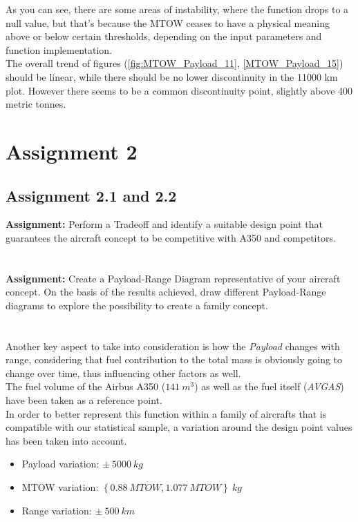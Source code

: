 \documentclass{article}
\begin{document}
As you can see, there are some areas of instability, where the function drops to a null value,
but that's because the MTOW ceases to have a physical meaning above or below certain
thresholds, depending on the input parameters and function implementation. \\ 
The overall trend of figures (\ref{fig:MTOW_Payload_11}, \ref{MTOW_Payload_15}) should be linear, while
there should be no lower discontinuity in the 11000 km plot.
However there seems to be a common discontinuity point, slightly above 400 metric tonnes.
\clearpage

\section{Assignment 2\label{Assignment_2}}
\subsection{Assignment 2.1 and 2.2\label{Assignment_2.1}}
\textbf{Assignment:} Perform a Tradeoff and identify a suitable design point that 
guarantees the aircraft concept to be competitive with A350 and competitors. \\ \\ \\ 
\textbf{Assignment:} Create a Payload-Range Diagram representative of your aircraft concept. 
On the basis of the results achieved, draw different Payload-Range diagrams to explore 
the possibility to create a family concept.\\ \\ \\ 


Another key aspect to take into consideration is how the \textit{Payload} changes with 
 range, considering that fuel contribution to the total mass is obviously going
to change over time, thus influencing other factors as well. \\ 
The fuel volume of the Airbus A350 ($141 \ m^3$) as well as
the fuel itself (\textit{AVGAS}) have been taken as a reference point.\\ 
In order to better represent this function within a family of aircrafts that
is compatible with our statistical sample, a variation around the design point values has been 
taken into account.\\ 

\begin{itemize}
    \item Payload variation: $\pm \ 5000 \ kg$
    \item MTOW variation: $\left \{ {0.88 \ MTOW, 1.077 \ MTOW} \right \} \ kg$
    \item Range variation: $\pm \ 500 \ km$
\end{itemize}
\end{document}
